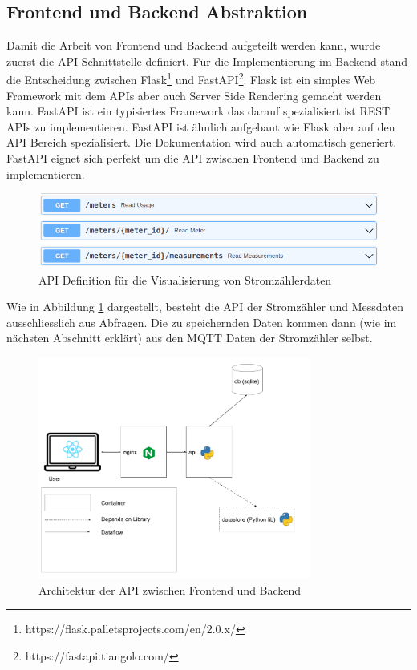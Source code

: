 \subsection{Frontend und Backend Abstraktion}

Damit die Arbeit von Frontend und Backend aufgeteilt werden kann, wurde zuerst
die \ac{API} Schnittstelle definiert. Für die Implementierung im Backend
stand die Entscheidung zwischen Flask\footnote{https://flask.palletsprojects.com/en/2.0.x/}
und FastAPI\footnote{https://fastapi.tiangolo.com/}.
Flask ist ein simples Web Framework mit dem \ac{API}s aber auch Server Side Rendering \cite{flask_server_side}
gemacht werden kann. FastAPI ist ein typisiertes Framework das darauf spezialisiert ist
\ac{REST} \ac{API}s zu implementieren. FastAPI ist ähnlich aufgebaut wie Flask aber auf den
\ac{API} Bereich spezialisiert. Die Dokumentation wird auch automatisch generiert.
FastAPI eignet sich perfekt um die \ac{API} zwischen Frontend und Backend zu implementieren.

\begin{figure}[h]
    \centering
    \includegraphics[width=1.0\textwidth]{gfx/api-visualization}
    \caption{
        \ac{API} Definition für die Visualisierung von Stromzählerdaten
    }
    \label{fig:api-visualization}
\end{figure}

Wie in Abbildung \ref{fig:api-visualization} dargestellt, besteht die \ac{API} der Stromzähler
und Messdaten ausschliesslich aus Abfragen. Die zu speichernden Daten kommen dann (wie im nächsten
Abschnitt erklärt) aus den \ac{MQTT} Daten der Stromzähler selbst.

\begin{figure}[h]
    \centering
    \includegraphics[width=0.8\textwidth]{gfx/sim-arch-api}
    \caption{
        Architektur der \ac{API} zwischen Frontend und Backend
    }
    \label{fig:arch-visualization-front-back}
\end{figure}

